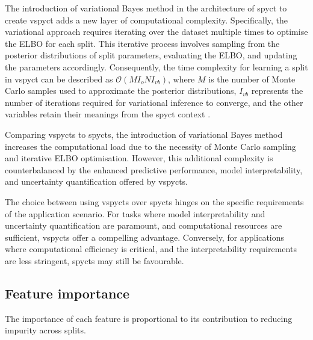 \documentclass[3p,review,authoryear]{elsarticle}
\begin{document}
The introduction of variational Bayes method in the architecture of \gls{spyct} to create \gls{vspyct} adds a new layer of computational complexity.
Specifically, the variational approach requires iterating over the dataset multiple times to optimise the ELBO for each split.
This iterative process involves sampling from the posterior distributions of split parameters, evaluating the ELBO, and updating the parameters accordingly.
Consequently, the time complexity for learning a split in \gls{vspyct} can be described as $\mathcal{O}(MI_oNI_{vb})$, where $M$ is the number of Monte Carlo samples used to approximate the posterior distributions, $I_{vb}$ represents the number of iterations required for variational inference to converge, and the other variables retain their meanings from the \gls{spyct} context .

Comparing \glspl{vspyct} to \glspl{spyct}, the introduction of variational Bayes method increases the computational load due to the necessity of Monte Carlo sampling and iterative ELBO optimisation.
However, this additional complexity is counterbalanced by the enhanced predictive performance, model interpretability, and uncertainty quantification offered by \glspl{vspyct}.

The choice between using \glspl{vspyct} over \glspl{spyct} hinges on the specific requirements of the application scenario.
For tasks where model interpretability and uncertainty quantification are paramount, and computational resources are sufficient, \glspl{vspyct} offer a compelling advantage.
Conversely, for applications where computational efficiency is critical, and the interpretability requirements are less stringent, \glspl{spyct} may still be favourable.

\subsection{Feature importance}

The importance of each feature is proportional to its contribution to reducing impurity across splits.
\end{document}
